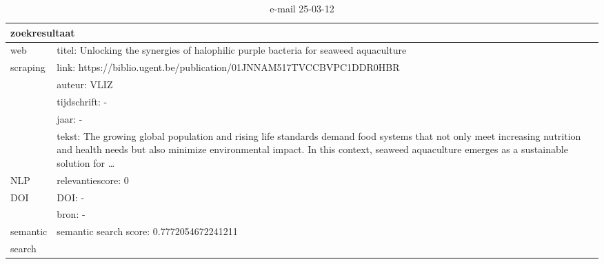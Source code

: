 \begin{table}[h!]
    \caption{e-mail 25-03-12}
    \centering
    \begin{tabularx}{\textwidth}{|p{4cm}|X|} 
        \hline
        \multicolumn{2}{|X|}{\textbf{zoekresultaat}} \\
        \hline
        web &titel: Unlocking the synergies of halophilic purple bacteria for seaweed aquaculture\\
        scraping&link: https://biblio.ugent.be/publication/01JNNAM517TVCCBVPC1DDR0HBR\\
        &auteur: VLIZ\\
        &tijdschrift: -\\
        &jaar: -\\
        &tekst: The growing global population and rising life standards demand food systems that not only meet increasing nutrition and health needs but also minimize environmental impact. In this context, seaweed aquaculture emerges as a sustainable solution for …\\
        \hline
        NLP&relevantiescore: 0\\
        \hline
        DOI&DOI: -\\
        &bron: -\\
        \hline
        semantic&semantic search score: 0.7772054672241211\\
        search&\\
        \hline
    \end{tabularx}
    \label{table:email20250312}
\end{table}
